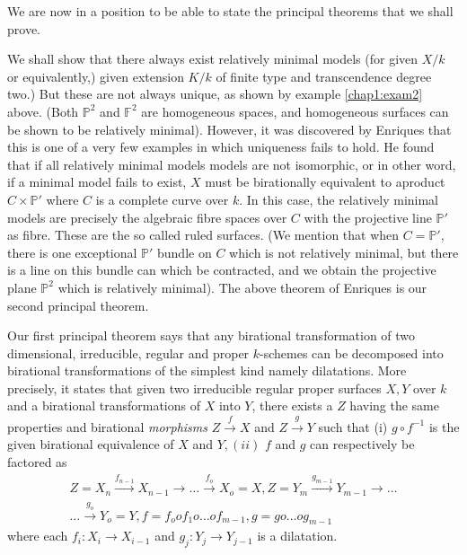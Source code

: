  We are now in a position to be able to state the principal theorems
 that we shall prove. 
 
 We shall show that there always exist relatively minimal models (for
 given $X/k$ or equivalently,) given extension $K/k$  of finite type
 and transcendence degree two.) But these are not always unique, as
 shown by example \ref{chap1:exam2} above. (Both $\mathbb{P}^2$ and
 $\mathbb{F}^2$ 
 are homogeneous spaces, and homogeneous surfaces can be shown to be
 relatively minimal). However, it was discovered by Enriques that this
 is one of a very few examples in which uniqueness fails to hold. He
 found that if all relatively minimal models models are not
 isomorphic, or in other word, if a minimal model fails to exist, $X$
 must be birationally equivalent to a\pageoriginale product  $C \times
 \mathbb{P}'$ where 
 $C$ is a complete curve over $k$. In this case, the relatively
 minimal models are precisely the algebraic fibre spaces over $C$ with
 the projective line $\mathbb{P}'$ as fibre. These are the so called
 ruled surfaces. (We mention that when $C = \mathbb{P}'$, there is
 one exceptional $\mathbb{P}'$ bundle on $C$ which is not relatively
 minimal, but there is a line on this bundle can which be contracted,
 and we obtain the projective plane $\mathbb{P}^2$ which is relatively
 minimal). The above theorem of Enriques is our second principal
 theorem.  
 
 Our first principal theorem says that any birational transformation
 of two dimensional, irreducible, regular and proper $k$-schemes can be
 decomposed into birational transformations of the simplest kind namely
 dilatations. More  precisely, it states that given two irreducible
 regular proper surfaces $X, Y$ over $k$ and a birational
 transformations of $X$ into $Y$, there exists a $Z$ having the
 same properties  and birational \textit{morphisms} $Z
 \overset{f}{\rightarrow} X$ and $Z \overset{g}{\rightarrow} Y$  such
 that (i) $g \circ f^{-1}$  is the given birational equivalence of
 $X$ and  $Y,(ii)$ $f$ and $g$ can respectively be factored as  
 \begin{multline*}
 Z = X_n \overset{f_{n-1}}{\rightarrow} X_{n-1} \rightarrow \dots
 \overset{f_o}{\rightarrow} X_o = X, Z = Y_m
 \overset{g_{m-1}}{\rightarrow} Y_{m-1} \rightarrow \dots \\
 \dots \overset{g_o}{\rightarrow} Y_o = Y, f = f_o o f_1 o\ldots o
 f_{m-1},  g = g o \ldots o g_{m-1}  
 \end{multline*}
 where each $f_i: X_i\rightarrow X_{i-1}$ and $g_j: Y_j \rightarrow
 Y_{j-1}$ is a dilatation. 

